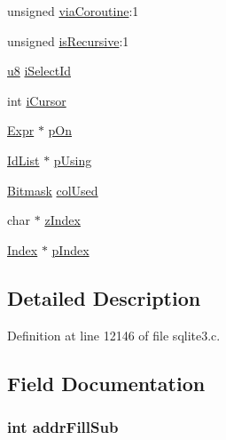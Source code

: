 \begin{DoxyCompactItemize}
\item 
unsigned \hyperlink{struct_src_list_1_1_src_list__item_a3f3cc0e4ed05e52d6535417108ab3f11}{via\+Coroutine}\+:1
\item 
unsigned \hyperlink{struct_src_list_1_1_src_list__item_a135424029850e97c5f5cad707182f47d}{is\+Recursive}\+:1
\item 
\hyperlink{sqlite3_8c_a74a0f6424ae628af25f23f0a35f6ead3}{u8} \hyperlink{struct_src_list_1_1_src_list__item_ae1e7b6e354cb7e8a3a6e74a306f14532}{i\+Select\+Id}
\item 
int \hyperlink{struct_src_list_1_1_src_list__item_af55c682e0c77506f24068e2adde30514}{i\+Cursor}
\item 
\hyperlink{struct_expr}{Expr} $\ast$ \hyperlink{struct_src_list_1_1_src_list__item_ae72acbfcc1ce3013b264aaa1f74c04c2}{p\+On}
\item 
\hyperlink{struct_id_list}{Id\+List} $\ast$ \hyperlink{struct_src_list_1_1_src_list__item_a6f5772207b3daabe55903e5db1e0e985}{p\+Using}
\item 
\hyperlink{sqlite3_8c_afa77b629897c4457bfdc47d364ba5c3f}{Bitmask} \hyperlink{struct_src_list_1_1_src_list__item_afa02135ab8d4146d04a435b9805ceeab}{col\+Used}
\item 
char $\ast$ \hyperlink{struct_src_list_1_1_src_list__item_adb55e49267d65b0604fe934aab05d569}{z\+Index}
\item 
\hyperlink{struct_index}{Index} $\ast$ \hyperlink{struct_src_list_1_1_src_list__item_a2bf7196ac1f39bd4b9dc95c3a9e9a68e}{p\+Index}
\end{DoxyCompactItemize}


\subsection{Detailed Description}


Definition at line 12146 of file sqlite3.\+c.



\subsection{Field Documentation}
\hypertarget{struct_src_list_1_1_src_list__item_a5673cf13e4e7b5bdff5c739a2074fe99}{}
\subsubsection[{addr\+Fill\+Sub}]{\setlength{\rightskip}{0pt plus 5cm}int addr\+Fill\+Sub}\label{struct_src_list_1_1_src_list__item_a5673cf13e4e7b5bdff5c739a2074fe99}


